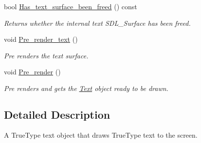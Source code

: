 \begin{DoxyCompactItemize}
bool \hyperlink{classjetfuel_1_1draw_1_1Text_a0968c175395924bca3cc2e543adce3e9}{Has\+\_\+text\+\_\+surface\+\_\+been\+\_\+freed} () const
\begin{DoxyCompactList}\small\item\em Returns whether the internal text S\+D\+L\+\_\+\+Surface has been freed. \end{DoxyCompactList}\item 
void \hyperlink{classjetfuel_1_1draw_1_1Text_a5ce2072f87c6e02dfbc363e1c489cc3b}{Pre\+\_\+render\+\_\+text} ()
\begin{DoxyCompactList}\small\item\em Pre renders the text surface. \end{DoxyCompactList}\item 
void \hyperlink{classjetfuel_1_1draw_1_1Text_ae25b3503ec6fcf36aaeebf4e08612394}{Pre\+\_\+render} ()
\begin{DoxyCompactList}\small\item\em Pre renders and gets the \hyperlink{classjetfuel_1_1draw_1_1Text}{Text} object ready to be drawn. \end{DoxyCompactList}\end{DoxyCompactItemize}


\subsection{Detailed Description}
A True\+Type text object that draws True\+Type text to the screen.

